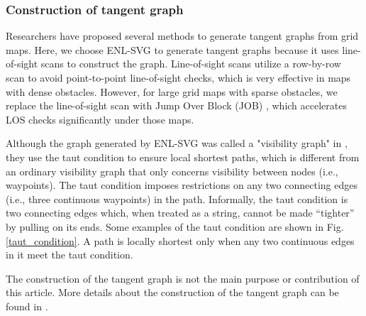 \documentclass[letterpaper, 10 pt, journal, twoside]{IEEEtran}
\begin{document}
\subsubsection{Construction of tangent graph}

Researchers have proposed several methods \cite{8, 17, 10} to generate tangent graphs from grid maps. Here, we choose ENL-SVG \cite{oh2017edge} to generate tangent graphs because it uses line-of-sight scans to construct the graph. Line-of-sight scans utilize a row-by-row scan to avoid point-to-point line-of-sight checks, which is very effective in maps with dense obstacles. However, for large grid maps with sparse obstacles, we replace the line-of-sight scan with Jump Over Block (JOB) \cite{10266687}, which accelerates LOS checks significantly under those maps.

Although the graph generated by ENL-SVG \cite{oh2017edge} was called a "visibility graph" in \cite{oh2017edge}, they use the taut condition to ensure local shortest paths, which is different from an ordinary visibility graph that only concerns visibility between nodes (i.e., waypoints). The taut condition imposes restrictions on any two connecting edges (i.e., three continuous waypoints) in the path. Informally, the taut condition is two connecting edges which, when treated as a string, cannot be made “tighter” by pulling on its ends. Some examples of the taut condition are shown in Fig. \ref{taut_condition}. A path is locally shortest only when any two continuous edges in it meet the taut condition.

The construction of the tangent graph is not the main purpose or contribution of this article. More details about the construction of the tangent graph can be found in \cite{oh2017edge}.
\end{document}
